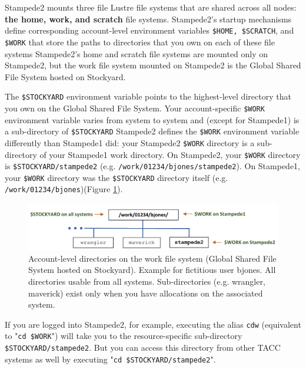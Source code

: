 \documentclass{article}
\begin{document}
Stampede2 mounts three file Lustre file systems that are shared across all nodes: \textbf{the home, work, and scratch} file systems. 
Stampede2's startup mechanisms define corresponding account-level environment variables \verb+$HOME, $SCRATCH+, and \verb+$WORK+ 
that store the paths to directories that you own on each of these file systems
Stampede2's home and scratch file systems are mounted only on Stampede2, but the work file system mounted on Stampede2 is the Global Shared File System hosted on Stockyard. 

The \verb+$STOCKYARD+ environment variable points to the highest-level directory that you own on the Global Shared File System.
Your account-specific \verb+$WORK+ environment variable varies from system to system and (except for Stampede1) is a sub-directory of \verb+$STOCKYARD+ 
Stampede2 defines the \verb+$WORK+ environment variable differently than Stampede1 did: your Stampede2 \verb+$WORK+ directory is a sub-directory of your Stampede1 work directory.
On Stampede2, your \verb+$WORK+ directory is \verb+$STOCKYARD/stampede2+ (e.g. \verb+/work/01234/bjones/stampede2+). On Stampede1, your \verb+$WORK+ directory was the \verb+$STOCKYARD+
directory itself (e.g. \verb+/work/01234/bjones+)(Figure \ref{Account_level_directories}).

\begin{figure}[htp]
    \centering
    \includegraphics[width=1\textwidth, height=.3\textwidth]{work-small.png}
    \caption{Account-level directories on the work file system (Global Shared File System hosted on Stockyard). Example for fictitious user bjones.
    All directories usable from all systems. Sub-directories (e.g. wrangler, maverick) exist only when you have allocations on the associated system.}
    \label{Account_level_directories}
\end{figure}

If you are logged into Stampede2, for example, executing the alias \verb+cdw+ (equivalent to "\verb+cd $WORK+") will take you to the resource-specific sub-directory \verb+$STOCKYARD/stampede2+.
But you can access this directory from other TACC systems as well by executing "\verb+cd $STOCKYARD/stampede2+".
\end{document}
